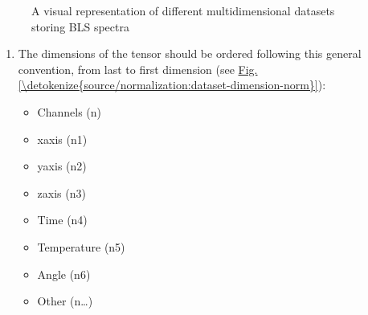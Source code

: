\documentclass[letterpaper,10pt,english]{sphinxmanual}
\begin{document}
\begin{figure}[htbp]
\centering
\capstart

\noindent{}
\caption{A visual representation of different multidimensional datasets storing BLS spectra}\label{\detokenize{source/normalization:id3}}\label{\detokenize{source/normalization:dataset-multidimensional}}\end{figure}
\begin{enumerate}
%
\setcounter{enumi}{1}
\item {} 
\sphinxAtStartPar
The dimensions of the tensor should be ordered following this general convention, from last to first dimension (see \hyperref[\detokenize{source/normalization:dataset-dimension-norm}]{Fig.\@ \ref{\detokenize{source/normalization:dataset-dimension-norm}}}):
\begin{itemize}
\item {} 
\sphinxAtStartPar
Channels (n)

\item {} 
\sphinxAtStartPar
x\sphinxhyphen{}axis (n\sphinxhyphen{}1)

\item {} 
\sphinxAtStartPar
y\sphinxhyphen{}axis (n\sphinxhyphen{}2)

\item {} 
\sphinxAtStartPar
z\sphinxhyphen{}axis (n\sphinxhyphen{}3)

\item {} 
\sphinxAtStartPar
Time (n\sphinxhyphen{}4)

\item {} 
\sphinxAtStartPar
Temperature (n\sphinxhyphen{}5)

\item {} 
\sphinxAtStartPar
Angle (n\sphinxhyphen{}6)

\item {} 
\sphinxAtStartPar
Other (n\sphinxhyphen{}…)

\end{itemize}

\end{enumerate}
\end{document}
